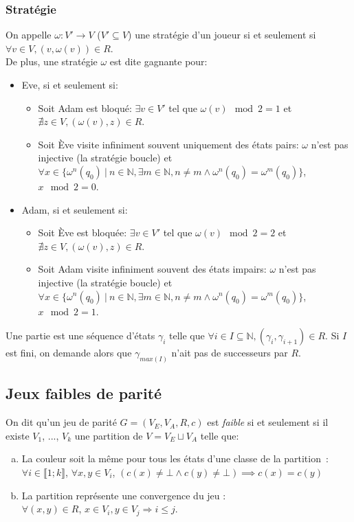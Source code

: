\documentclass[10pt,a4paper]{article}
\begin{document}
\subsubsection{Stratégie}
On appelle $\omega : V' \to V$ ($V' \subseteq V$) une stratégie d'un joueur si et seulement si $\forall v \in V, (v,\omega(v)) \in R$.\\
De plus, une stratégie $\omega$ est dite gagnante pour:
\begin{itemize}
	\item Eve, si et seulement si:
	\begin{itemize}
		\item Soit Adam est bloqué: $\exists v \in V'$ tel que $\omega(v) \mod 2 = 1$ et $\nexists z \in V, (\omega(v), z) \in R$.
		\item Soit Ève visite infiniment souvent uniquement des états pairs: $\omega$ n'est pas injective (la stratégie boucle) et $\forall x \in \{\omega^n(q_0)\ |\ n\in \mathbb{N}, \exists m \in \mathbb{N}, n \neq  m \land \omega^n(q_0) = \omega^m(q_0)\}$, $x \mod 2 = 0$.
	\end{itemize}
	\item Adam, si et seulement si:
	\begin{itemize}
		\item Soit Ève est bloquée: $\exists v \in V'$ tel que $\omega(v) \mod 2 = 2$ et $\nexists z \in V, (\omega(v), z) \in R$.
		\item Soit Adam visite infiniment souvent des états impairs: $\omega$ n'est pas injective (la stratégie boucle) et $\forall x \in \{\omega^n(q_0)\ |\ n\in \mathbb{N}, \exists m \in \mathbb{N}, n \neq  m \land \omega^n(q_0) = \omega^m(q_0)\}$, $x \mod 2 = 1$.
\end{itemize}
\end{itemize}

Une partie est une séquence d'états $\gamma_i$ telle que $\forall i \in I \subseteq \mathbb{N}, (\gamma_i,\gamma_{i+1}) \in R$. Si $I$ est fini, on demande alors que $\gamma_{max(I)}$ n'ait pas de successeurs par $R$.

\subsection{Jeux faibles de parité}

On dit qu'un jeu de parité $G = (V_E,V_A,R,c)$ est \emph{faible}  si et seulement si il existe $V_1$, ..., $V_k$ une partition de $V = V_E \sqcup V_A$ telle que:
\begin{enumerate}[a)]
\item La couleur soit la même pour tous les états d'une classe de la partition : $\forall i \in \llbracket 1 ; k \rrbracket$, $\forall x, y \in V_i$, $(c(x) \neq \bot \land c(y) \neq \bot)  \implies c(x) = c(y)$
\item La partition représente une convergence du jeu :\\
$\forall (x, y) \in R$, $x\in V_i, y \in V_j \Rightarrow i \leq j$.
\end{enumerate}
\end{document}
